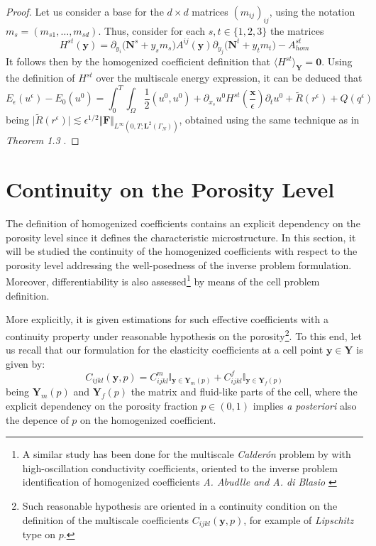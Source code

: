 \begin{proof}
Let us consider a base for the $d\times d$ matrices $(m_{ij})_{ij}$, using the notation $m_s = (m_{s1}, \dots, m_{sd})$. Thus, consider for each $s, t \in \{1,2,3\}$ the matrices 
\begin{equation*}
    H^{st}(\mathbf{y}) = \partial_{y_i}\big(\mathbf{N}^s + y_s m_s\big) A^{ij}(\mathbf{y}) \partial_{y_j} \big(\mathbf{N}^t +  y_t m_t\big) - A^{st}_{hom}
\end{equation*}
It follows then by the homogenized coefficient definition that $\langle H^{st} \rangle_{\mathbf{Y}} = \mathbf{0}$.
Using the definition of $H^{st}$ over the multiscale energy expression, it can be deduced that
\begin{equation*}
    E_{\epsilon}(u^{\epsilon}) - E_{0}(u^{0}) = \int_0^T \int_{\Omega} \frac{1}{2}(u^0, u^0) + \partial_{x_s}u^0 H^{st}(\frac{\mathbf{x}}{\epsilon}) \partial_{t}u^0  + \tilde{R}(r^{\epsilon}) + Q(q^{\epsilon})
\end{equation*}
being $\vert \tilde{R}(r^{\epsilon})\vert \lesssim \epsilon^{1/2}\Vert \mathbf{F} \Vert_{L^{\infty}(0,T;\mathbf{L}^2(\Gamma_N))}$, obtained using the same technique as in \textit{Theorem 1.3} \cite{oleinik1992mathematical}.
\end{proof}

\section{Continuity on the Porosity Level}
The definition of homogenized coefficients contains an explicit dependency on the porosity level since it defines the characteristic microstructure. In this section, it will be studied the continuity of the homogenized coefficients with respect to the porosity level addressing the well-posedness of the inverse problem formulation. Moreover, differentiability is also assessed\footnote{A similar study has been done for the multiscale \textit{Calderón} problem by with high-oscillation conductivity coefficients, oriented to the inverse problem identification of homogenized coefficients \textit{A. Abudlle and A. di Blasio} \cite{Abdulle:221051}} by means of the cell problem definition. 

More explicitly, it is given estimations for such effective coefficients with a continuity property under reasonable hypothesis on the porosity\footnote{Such reasonable hypothesis are oriented in a continuity condition on the definition of the multiscale coefficients $C_{ijkl}(\mathbf{y},p)$, for example of \textit{Lipschitz} type on $p$.}. To this end, let us recall that our formulation for the elasticity coefficients at a cell point $\mathbf{y}\in \mathbf{Y}$ is given by:
\begin{equation*}
    C_{ijkl}(\mathbf{y}, p) = C_{ijkl}^{m} \mathbb{I}_{\mathbf{y} \in \mathbf{Y}_m(p)} + C_{ijkl}^{f} \mathbb{I}_{\mathbf{y} \in \mathbf{Y}_f(p)}
\end{equation*}
being $\mathbf{Y}_m(p)$ and $\mathbf{Y}_f(p)$ the matrix and fluid-like parts of the cell, where the explicit dependency on the porosity fraction $p \in (0,1)$ implies \textit{a posteriori} also the depence of $p$ on the homogenized coefficient.

